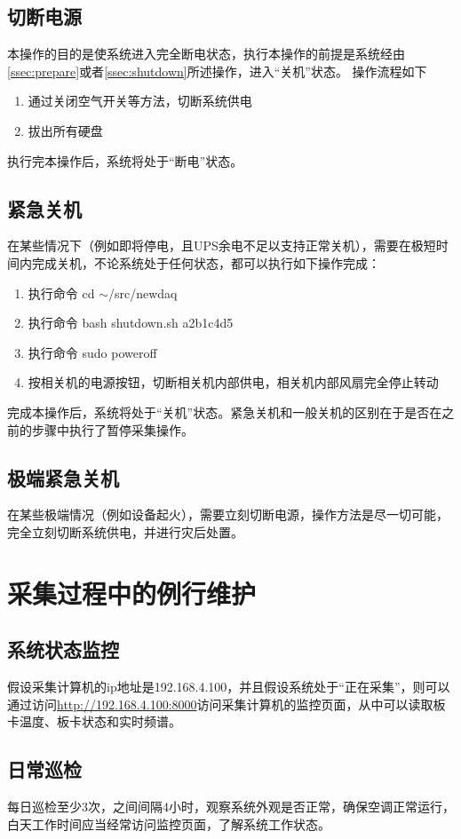 \documentclass[11pt,includemp,a4paper]{article}
\begin{document}
\subsection{切断电源}
\label{ssec:cut_power}
本操作的目的是使系统进入完全断电状态，执行本操作的前提是系统经由\ref{ssec:prepare}或者\ref{ssec:shutdown}所述操作，进入“关机”状态。
操作流程如下
\begin{enumerate}
    \item 通过关闭空气开关等方法，切断系统供电
    \item 拔出所有硬盘
\end{enumerate}
执行完本操作后，系统将处于“断电”状态。

\subsection{紧急关机}
在某些情况下（例如即将停电，且UPS余电不足以支持正常关机），需要在极短时间内完成关机，不论系统处于任何状态，都可以执行如下操作完成：
\begin{enumerate}
    \item 执行命令 cd $\sim$/src/newdaq
    \item 执行命令 bash shutdown.sh a2b1c4d5
    \item 执行命令 sudo poweroff
    \item 按相关机的电源按钮，切断相关机内部供电，相关机内部风扇完全停止转动
\end{enumerate}

完成本操作后，系统将处于“关机”状态。紧急关机和一般关机的区别在于是否在之前的步骤中执行了暂停采集操作。

\subsection{极端紧急关机}
在某些极端情况（例如设备起火），需要立刻切断电源，操作方法是尽一切可能，完全立刻切断系统供电，并进行灾后处置。

\section{采集过程中的例行维护}
\subsection{系统状态监控}
假设采集计算机的ip地址是192.168.4.100，并且假设系统处于“正在采集”，则可以通过访问\url{http://192.168.4.100:8000}访问采集计算机的监控页面，从中可以读取板卡温度、板卡状态和实时频谱。

\subsection{日常巡检}
每日巡检至少3次，之间间隔4小时，观察系统外观是否正常，确保空调正常运行，白天工作时间应当经常访问监控页面，了解系统工作状态。
\end{document}
